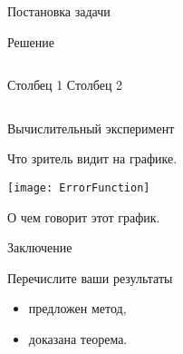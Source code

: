 \documentclass{beamer}
\begin{document}
\begin{frame}{Постановка задачи}

\end{frame}
\begin{frame}{Решение}
\begin{columns}[c]
    Столбец 1
    Столбец 2
\end{columns}
\end{frame}
\begin{frame}{Вычислительный эксперимент}

 Что зритель видит на графике.

\texttt{[image: ErrorFunction]}

О чем говорит этот график.

\end{frame}
\begin{frame}{Заключение}
    \begin{block}{Перечислите ваши результаты}
    \begin{itemize}
        \item предложен метод,
        \item доказана теорема.
    \end{itemize}
    \end{block}
\end{frame}
\end{document}
